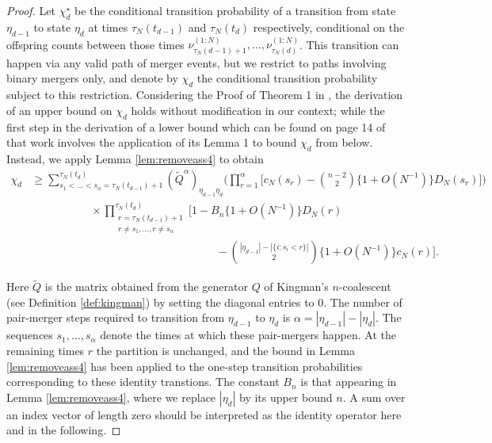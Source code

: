 \documentclass{article} %
\theoremstyle{definition}
\newcommand{\1}[1]{\mathbbm{1}_{\{#1\}}}
\begin{document}
\begin{proof}
Let $\chi^\star_d$ be the conditional transition probability of a transition from state $\eta_{d-1}$ to state $\eta_d$ at times $\tau_N(t_{d-1})$ and $\tau_N(t_d)$ respectively, conditional on the offspring counts between those times $\nu^{(1:N)}_{\tau_N(d-1) +1} , \dots, \nu^{(1:N)}_{\tau_N(d)}$. 
This transition can happen via any valid path of merger events, but we restrict to paths involving binary mergers only, and denote by $\chi_d$ the conditional transition probability subject to this restriction.
Considering the Proof of Theorem 1 in \cite{koskela2018}, the derivation of an upper bound on $\chi_d$ holds without modification in our context; while the first step in the derivation of a lower bound which can be found on page 14 of that work involves the application of its Lemma 1 to bound $\chi_d$ from below.
Instead, we apply Lemma \ref{lem:removeass4} to obtain
\begin{align*}
\chi_d &\geq \sum_{ s_1 < \ldots < s_{ \alpha } = \tau_N( t_{ d - 1 } ) + 1 }^{ \tau_N( t_d ) } ( \tilde{ Q }^{ \alpha } )_{ \eta_{ d - 1 } \eta_d } \Bigg( \prod_{ r = 1 }^{ \alpha } \Bigg[ c_N( s_r ) - \binom{ n - 2 }{ 2 } \{ 1+ O( N^{ -1 } ) \} D_N( s_r ) \Bigg] \Bigg) \\
&\qquad\qquad\phantom{\geq} \times \prod_{ \substack{ r = \tau_N( t_{ d - 1 } ) + 1 \\ r \neq s_1, \ldots, r \neq s_{ \alpha } } }^{ \tau_N( t_d ) } \Bigg[ 1 - B_n \{ 1 + O( N^{ -1 } ) \} D_N( r ) \\
&\qquad\qquad\qquad\phantom{ \geq \times \prod_{ \substack{ r = \tau_N( t_{ d - 1 } ) + 1 \\ r \neq s_1, \ldots, r \neq s_{ \alpha } } }^{ \tau_N( t_d ) } \Bigg[ 1 } - \binom{ | \eta_{ d - 1 } | - | \{ i : s_i < r \} | }{ 2 } \{ 1 + O( N^{ -1 } ) \} c_N( r ) \Bigg] .
\end{align*}
Here $\tilde{Q}$ is the matrix obtained from the generator $Q$ of Kingman's $n$-coalescent (see Definition \ref{def:kingman}) by setting the diagonal entries to 0.
The number of pair-merger steps required to transition from $\eta_{d-1}$ to $\eta_d$ is $\alpha = |\eta_{d-1}| - |\eta_d|$. The sequences $s_1,\dots,s_\alpha$ denote the times at which these pair-mergers happen. 
At the remaining times $r$ the partition is unchanged, and the bound in Lemma \ref{lem:removeass4} has been applied to the one-step transition probabilities corresponding to these identity transtions. The constant $B_n$ is that appearing in Lemma \ref{lem:removeass4}, where we replace $|\eta_d|$ by its upper bound $n$.
A sum over an index vector of length zero should be interpreted as the identity operator here and in the following.


\end{proof}
\end{document}
